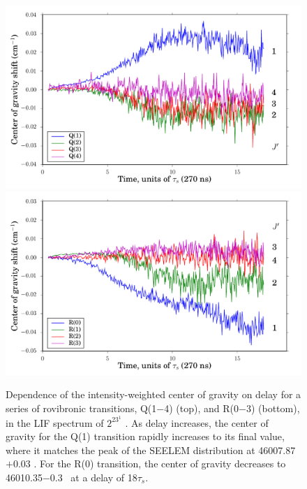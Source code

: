 \documentclass[12pt]{mitthesis}
\begin{document}
\begin{figure}
  \caption{Dependence of the intensity-weighted center of gravity on
    delay for a series of rovibronic transitions, Q(1$-$4) (top), and
    R(0$-$3) (bottom), in the LIF spectrum of $2^23^1$ .  As
    delay increases, the center of gravity for the Q(1) transition
    rapidly increases to its final value, where it matches the peak of
    the SEELEM distribution at 46007.87$+$0.03 \rcm.  For the R(0)
    transition, the center of gravity decreases to 46010.35$-$0.3
    \rcm\ at a delay of 18$\tau_s$.}
  \label{fig:2231-cog-delay}
  \centering
  \vspace{5mm}
  \includegraphics[width=6in]{2231-q1234-cog-delay.pdf}
  \includegraphics[width=6in]{2231-r0123-cog-delay.pdf}
\end{figure}

\end{document}

